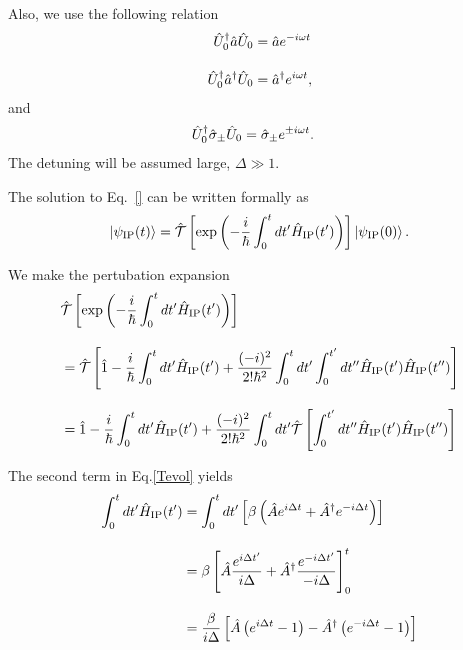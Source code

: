 Also, we use the following relation
\begin{align}
    {\hat{U}}^{\dagger}_0\hat{a}{\hat{U}}_0&=\hat{a}e^{-i\omega t}\\[10pt]
    {\hat{U}}^{\dagger}_0\hat{a}^{\dagger}{\hat{U}}_0&=\hat{a}^{\dagger}e^{i\omega t},
\end{align}
and 
\begin{align}
    {\hat{U}}^{\dagger}_0\hat{\sigma}_{\pm}{\hat{U}}_0&=\hat{\sigma}_{\pm}e^{\pm i\omega t}.
\end{align}
The detuning will be assumed large, $\Delta \gg 1$.

The solution to Eq.~\eqref{} can be written formally as
\begin{equation}
    \ket{\psi_{\rm{IP}}(t)}=
    \hat{\mathcal{T}}\left[
    \exp{\left(
    -\frac{i}{\hbar}\int_0^t dt^\prime \hat{H}_{\rm{IP}}(t^\prime)
    \right)}
    \right]\ket{\psi_{\rm{IP}}(0)}.
\end{equation}

We make the pertubation expansion
\begin{align}\label{Tevol}
    &\hat{\mathcal{T}}\left[
    \exp{\left(
    -\frac{i}{\hbar}\int_0^t dt^\prime \hat{H}_{\rm{IP}}(t^\prime)
    \right)}
    \right]\nn[10pt]
    &=\hat{\mathcal{T}}\left[
    \hat{1}-\frac{i}{\hbar}\int_0^{t}dt^\prime \hat{H}_{\rm{IP}}(t^\prime)
    +\frac{(-i)^2}{2!\hbar^2}\int_0^{t}dt^\prime 
    \int_0^{t^\prime}dt^{\prime\prime} \hat{H}_{\rm{IP}}(t^\prime)\hat{H}_{\rm{IP}}(t^{\prime\prime})
    \right]\nn[10pt]
    &=
    \hat{1}-\frac{i}{\hbar}\int_0^{t}dt^\prime \hat{H}_{\rm{IP}}(t^\prime)
    +\frac{(-i)^2}{2!\hbar^2}\int_0^{t}dt^\prime
    \hat{\mathcal{T}}\left[
    \int_0^{t^\prime}dt^{\prime\prime} \hat{H}_{\rm{IP}}(t^\prime)\hat{H}_{\rm{IP}}(t^{\prime\prime})
    \right]
\end{align}

The second term in Eq.\eqref{Tevol} yields
\begin{align}
    \int_0^{t}dt^\prime \hat{H}_{\rm{IP}}(t^\prime)
    &=\int_0^{t}dt^\prime 
    \left[
    \beta
    \left(
    \hat{A}e^{i\Delta t} 
    + \hat{A}^{\dagger}e^{-i\Delta t} 
    \right)
    \right]\nn[10pt]
    &=\beta
    \left[
    \hat{A}
    \frac{e^{i\Delta t^\prime}}{i\Delta}
    +\hat{A}^\dagger\frac{e^{-i\Delta t^\prime}}{-i\Delta}
    \right]_0^t\nn[10pt]
    &=\frac{\beta}{i\Delta}
    \left[
    \hat{A}
    \left(e^{i\Delta t}-1\right)
    -\hat{A}^\dagger\left(e^{-i\Delta t}-1\right)
    \right]
\end{align}


